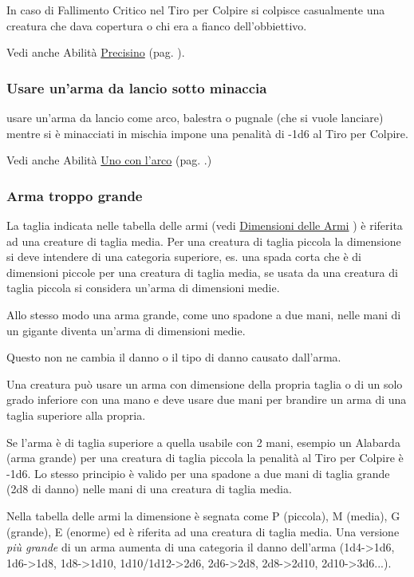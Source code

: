 \begin{multicols}{2}
In caso di Fallimento Critico nel Tiro per Colpire si colpisce casualmente una creatura che dava copertura o chi era a fianco dell'obbiettivo.

Vedi anche Abilità \hyperlink{Precisino}{Precisino} (pag. \pageref{Precisino}).

\subsubsection{Usare un'arma da lancio sotto minaccia} \label{usarearmalanciosottominaccia}

usare un'arma da lancio come arco, balestra o pugnale (che si vuole lanciare) mentre si è minacciati in mischia impone una penalità di -1d6 al Tiro per Colpire.

Vedi anche Abilità \hyperlink{Uno con l'arco}{Uno con l'arco} (pag. \pageref{Uno con l'arco}.)

\subsubsection{Arma troppo grande} \label{armatroppogrande}

La taglia indicata nelle tabella delle armi (vedi \hyperlink{dimensionediunarma}{Dimensioni delle Armi} ) è riferita ad una creature di taglia media. Per una creatura di taglia piccola la dimensione si deve intendere di una categoria superiore, es. una spada corta che è di dimensioni piccole per una creatura di taglia media, se usata da una creatura di taglia piccola si considera un'arma di dimensioni medie.

Allo stesso modo una arma grande, come uno spadone a due mani, nelle mani di un gigante diventa un'arma di dimensioni medie.

Questo non ne cambia il danno o il tipo di danno causato dall'arma.

Una creatura può usare un arma con dimensione della propria taglia o di un solo grado inferiore con una mano e deve usare due mani per brandire un arma di una taglia superiore alla propria.

Se l'arma è di taglia superiore a quella usabile con 2 mani, esempio un Alabarda (arma grande) per una creatura di taglia piccola la penalità al Tiro per Colpire è -1d6. Lo stesso principio è valido per una spadone a due mani di taglia grande (2d8 di danno) nelle mani di una creatura di taglia media.

Nella tabella delle armi la dimensione è segnata come P (piccola), M (media), G (grande), E (enorme) ed è riferita ad una creatura di taglia media. Una versione \emph{più grande} di un arma aumenta di una categoria il danno dell'arma (1d4->1d6, 1d6->1d8, 1d8->1d10, 1d10/1d12->2d6, 2d6->2d8, 2d8->2d10, 2d10->3d6...).


\end{multicols}
